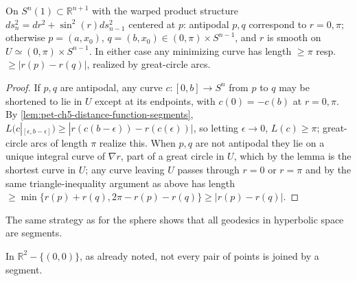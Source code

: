 \begin{example}
  \label{ex:pet-ch5-sphere-segments}
  On $S^n(1)\subset\mathbb R^{n+1}$ with the warped product structure
  $ds_n^2=dr^2+\sin^2(r)ds_{n-1}^2$ centered at $p$: antipodal $p,q$ correspond to
  $r=0,\pi$; otherwise $p=(a,x_0)$, $q=(b,x_0)\in(0,\pi)\times S^{n-1}$, and $r$ is
  smooth on $U\simeq(0,\pi)\times S^{n-1}$. In either case any minimizing curve has
  length $\ge\pi$ resp.\ $\ge|r(p)-r(q)|$, realized by great-circle arcs.
\end{example}
\begin{proof}
  If $p,q$ are antipodal, any curve $c:[0,b]\to S^n$ from $p$ to $q$ may be shortened
  to lie in $U$ except at its endpoints, with $c(0)=-c(b)$ at $r=0,\pi$. By
  \cref{lem:pet-ch5-distance-function-segments},
  $L(c|_{[\epsilon,b-\epsilon]})\ge|r(c(b-\epsilon))-r(c(\epsilon))|$, so letting
  $\epsilon\to0$, $L(c)\ge\pi$; great-circle arcs of length $\pi$ realize this. When
  $p,q$ are not antipodal they lie on a unique integral curve of $\nabla r$, part of a
  great circle in $U$, which by the lemma is the shortest curve in $U$; any curve
  leaving $U$ passes through $r=0$ or $r=\pi$ and by the same triangle-inequality
  argument as above has length $\ge\min\{r(p)+r(q),2\pi-r(p)-r(q)\}\ge|r(p)-r(q)|$.
\end{proof}

\begin{example}
  \label{ex:pet-ch5-hyperbolic-segments}
  The same strategy as for the sphere shows that all geodesics in hyperbolic space
  are segments.
\end{example}

\begin{example}
  \label{ex:pet-ch5-punctured-plane-no-segment}
  In $\mathbb R^2-\{(0,0)\}$, as already noted, not every pair of points is joined by
  a segment.
\end{example}

